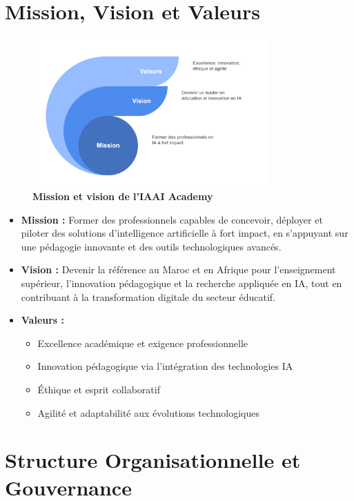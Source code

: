 \section{Mission, Vision et Valeurs}

\begin{figure}[H]
  \centering
  \includegraphics[width=0.8\textwidth]{images/mession.png}
  \caption{\textbf{Mission et vision de l'IAAI Academy}}
  \label{fig:mission}
\end{figure}

\begin{itemize}
  \item \textbf{Mission :} Former des professionnels capables de concevoir, déployer et piloter des solutions d'intelligence artificielle à fort impact, en s'appuyant sur une pédagogie innovante et des outils technologiques avancés.
  
  \item \textbf{Vision :} Devenir la référence au Maroc et en Afrique pour l'enseignement supérieur, l'innovation pédagogique et la recherche appliquée en IA, tout en contribuant à la transformation digitale du secteur éducatif.
  
  \item \textbf{Valeurs :}
  \begin{itemize}
    \item Excellence académique et exigence professionnelle
    \item Innovation pédagogique via l'intégration des technologies IA
    \item Éthique et esprit collaboratif
    \item Agilité et adaptabilité aux évolutions technologiques
  \end{itemize}
\end{itemize}

\section{Structure Organisationnelle et Gouvernance}

